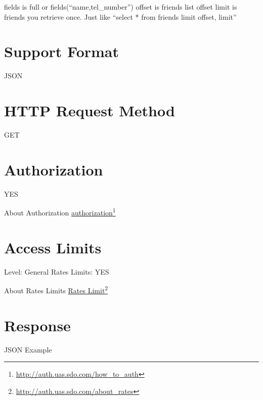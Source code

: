 fields is full or fields(``name,tel\_number'')
offset is friends list offset
limit is friends you retrieve once.
Just like ``select * from friends limit offset, limit''

\section{Support Format}
\label{supportformat}

JSON

\section{HTTP Request Method}
\label{httprequestmethod}

GET

\section{Authorization}
\label{authorization}

YES

About Authorization \href{http://auth.uas.sdo.com/how_to_auth}{authorization}\footnote{\href{http://auth.uas.sdo.com/how_to_auth}{http:/\slash auth.uas.sdo.com\slash how\_to\_auth}}

\section{Access Limits}
\label{accesslimits}

Level: General
Rates Limits: YES

About Rates Limits \href{http://auth.uas.sdo.com/about_rates}{Rates Limit}\footnote{\href{http://auth.uas.sdo.com/about_rates}{http:/\slash auth.uas.sdo.com\slash about\_rates}}

\section{Response}
\label{response}

JSON Example

